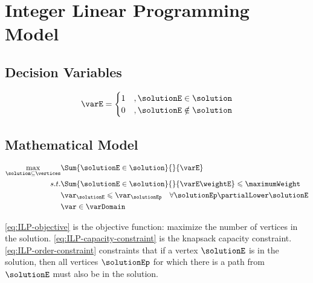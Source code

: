 \section{Integer Linear Programming Model}

\subsection{Decision Variables}

\begin{equation}
    \label{eq:decision-variables}
    \varE =  \begin{cases}
      1 &, \solutionE \in \solution \\
      0 &, \solutionE \notin \solution
   \end{cases}
\end{equation}

\subsection{Mathematical Model}

\begin{align}
    \label{eq:ILP-objective}
    \max\limits_{\solution \subseteq \vertices}
        & \Sum{\solutionE \in \solution}{}{\varE} \\
    s.t.
    \label{eq:ILP-capacity-constraint}
    & \Sum{\solutionE \in \solution}{}{\varE \weightE} \leqslant \maximumWeight \\
    \label{eq:ILP-order-constraint}
    & \var_{\solutionE} \leqslant \var_{\solutionEp} \quad \forall \solutionEp \partialLower \solutionE \\
    \label{eq:ILP-binary-constraint}
    & \var \in \varDomain
\end{align}

\eqref{eq:ILP-objective} is the objective function: maximize the number of vertices in the solution.
\eqref{eq:ILP-capacity-constraint} is the knapsack capacity constraint.
\eqref{eq:ILP-order-constraint} constraints that if a vertex $\solutionE$ is in the solution, then all vertices $\solutionEp$ for which there is a path from $\solutionE$ must also be in the solution.

